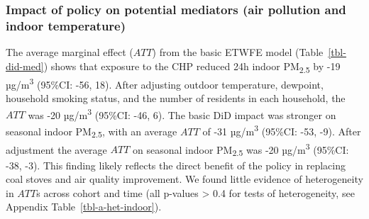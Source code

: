\documentclass[
  letterpaper,
  DIV=11,
  numbers=noendperiod]{scrartcl}
\begin{document}
\subsubsection{Impact of policy on potential mediators (air pollution
and indoor
temperature)}\label{impact-of-policy-on-potential-mediators-air-pollution-and-indoor-temperature}

The average marginal effect (\(ATT\)) from the basic ETWFE model
(Table~\ref{tbl-did-med}) shows that exposure to the CHP reduced 24h
indoor PM\textsubscript{2.5} by -19 µg/m\textsuperscript{3} (95\%CI:
-56, 18). After adjusting outdoor temperature, dewpoint, household
smoking status, and the number of residents in each household, the
\(ATT\) was -20 µg/m\textsuperscript{3} (95\%CI: -46, 6). The basic DiD
impact was stronger on seasonal indoor PM\textsubscript{2.5}, with an
average \(ATT\) of -31 µg/m\textsuperscript{3} (95\%CI: -53, -9). After
adjustment the average \(ATT\) on seasonal indoor PM\textsubscript{2.5}
was -20 µg/m\textsuperscript{3} (95\%CI: -38, -3). This finding likely
reflects the direct benefit of the policy in replacing coal stoves and
air quality improvement. We found little evidence of heterogeneity in
\(ATT\)s across cohort and time (all p-values \textgreater{} 0.4 for
tests of heterogeneity, see Appendix Table~\ref{tbl-a-het-indoor}).
\end{document}
